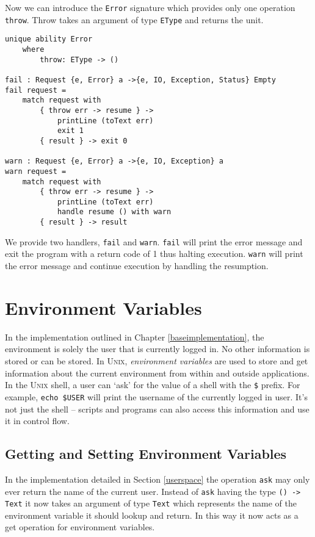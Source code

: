 \documentclass[logo,bsc,singlespacing,parskip]{infthesis}
\begin{document}
Now we can introduce the \texttt{Error} signature which provides only one
operation \texttt{throw}. Throw takes an argument of type \texttt{EType} and
returns the unit.

\begin{lstlisting}[language=unison]
unique ability Error
    where
        throw: EType -> ()

fail : Request {e, Error} a ->{e, IO, Exception, Status} Empty
fail request =
    match request with
        { throw err -> resume } -> 
            printLine (toText err)
            exit 1
        { result } -> exit 0

warn : Request {e, Error} a ->{e, IO, Exception} a
warn request =
    match request with
        { throw err -> resume } -> 
            printLine (toText err)
            handle resume () with warn
        { result } -> result
\end{lstlisting}

We provide two handlers, \texttt{fail} and \texttt{warn}. \texttt{fail} will
print the error message and exit the program with a return code of 1 thus
halting execution. \texttt{warn} will print the error message and continue
execution by handling the resumption.

\section{Environment Variables}

In the implementation outlined in Chapter \ref{baseimplementation}, the
environment is solely the user that is currently logged in. No other
information is stored or can be stored. In \textsc{Unix}, \emph{environment
variables} are used to store and get information about the current environment
from within and outside applications. In the \textsc{Unix} shell, a user can
`ask' for the value of a shell with the \texttt{\$} prefix. For example,
\texttt{echo \$USER} will print the username of the currently logged in user.
It's not just the shell -- scripts and programs can also access this
information and use it in control flow.

\subsection{Getting and Setting Environment Variables}

In the implementation detailed in Section \ref{userspace} the operation
\texttt{ask} may only ever return the name of the current user. Instead of
\texttt{ask} having the type \texttt{() -> Text} it now takes an argument of
type \texttt{Text} which represents the name of the environment variable it
should lookup and return. In this way it now acts as a get operation for
environment variables. 
\end{document}
